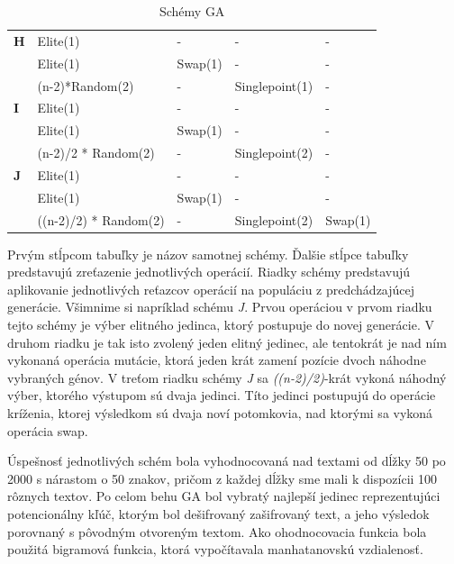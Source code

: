 \begin{table}[!htbp]
\begin{tabular}{@{}lllll@{}}
\textbf{H}      & Elite(1)                  & -                & -                 & -                    \\
                & Elite(1)                  & Swap(1)          & -                 & -                    \\
                & (n-2)*Random(2)           & -                & Singlepoint(1)    & -                    \\ \midrule
\textbf{I}      & Elite(1)                  & -                & -                 & -                    \\
                & Elite(1)                  & Swap(1)          & -                 & -                    \\
                & (n-2)/2 * Random(2)       & -                & Singlepoint(2)    & -                    \\ \midrule
\textbf{J}      & Elite(1)                  & -                & -                 & -                    \\
                & Elite(1)                  & Swap(1)          & -                 & -                    \\
                & ((n-2)/2) * Random(2)     & -                & Singlepoint(2)    & Swap(1)              \\ \bottomrule
\end{tabular}
\caption{Schémy GA}
\label{tab:schemy}
\end{table}

Prvým stĺpcom tabuľky je názov samotnej schémy. Ďalšie stĺpce tabuľky predstavujú zreťazenie jednotlivých operácií. Riadky schémy predstavujú aplikovanie jednotlivých reťazcov operácií na populáciu z predchádzajúcej generácie.
Všimnime si napríklad schému \textit{J}.
Prvou operáciou v prvom riadku tejto schémy je výber elitného jedinca, ktorý postupuje do novej generácie.
V druhom riadku je tak isto zvolený jeden elitný jedinec, ale tentokrát je nad ním vykonaná operácia mutácie, ktorá jeden krát zamení pozície dvoch náhodne vybraných génov.
V treťom riadku schémy \textit{J} sa \textit{((n-2)/2)}-krát vykoná náhodný výber, ktorého výstupom sú dvaja jedinci. Títo jedinci postupujú do operácie kríženia, ktorej výsledkom sú dvaja noví potomkovia, nad ktorými sa vykoná operácia swap.

Úspešnosť jednotlivých schém bola vyhodnocovaná nad textami od dĺžky 50 po 2000 s nárastom o 50 znakov,
pričom z každej dĺžky sme mali k dispozícii 100 rôznych textov.
Po celom behu GA bol vybratý najlepší jedinec reprezentujúci potencionálny kľúč,
ktorým bol dešifrovaný zašifrovaný text, a jeho výsledok porovnaný s pôvodným otvoreným textom.
Ako ohodnocovacia funkcia bola použitá bigramová funkcia, ktorá vypočítavala manhatanovskú vzdialenosť.

